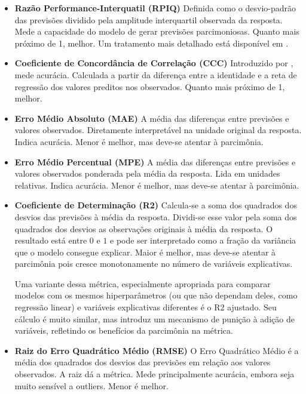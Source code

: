 \begin{itemize}
    \item \textbf{Razão Performance-Interquatil (RPIQ)} \newline
    Definida como o desvio-padrão das previsões dividido pela amplitude interquartil observada da resposta. Mede a capacidade do modelo de gerar previsões parcimoniosas. Quanto mais próximo de 1, melhor. Um tratamento mais detalhado está disponível em .
    
    \item \textbf{Coeficiente de Concordância de Correlação (CCC)} \newline
    Introduzido por , mede acurácia. Calculada a partir da diferença entre a identidade e a reta de regressão dos valores preditos nos observados. Quanto mais próximo de 1, melhor.
    
    \item \textbf{Erro Médio Absoluto (MAE)} \newline
    A média das diferenças entre previsões e valores observados. Diretamente interpretável na unidade original da resposta. Indica acurácia. Menor é melhor, mas deve-se atentar à parcimônia.
    
    \item \textbf{Erro Médio Percentual (MPE)} \newline
    A média das diferenças entre previsões e valores observados ponderada pela média da resposta. Lida em unidades relativas. Indica acurácia. Menor é melhor, mas deve-se atentar à parcimônia.
    
    \item \textbf{Coeficiente de Determinação (R2)} \newline
    Calcula-se a soma dos quadrados dos desvios das previsões à média da resposta. Dividi-se esse valor pela soma dos quadrados dos desvios as observações originais à média da resposta. O resultado está entre $0$ e $1$ e pode ser interpretado como a fração da variância que o modelo consegue explicar. Maior é melhor, mas deve-se atentar à parcimônia pois cresce monotonamente no número de variáveis explicativas.
    
    Uma variante dessa métrica, especialmente apropriada para comparar modelos com os mesmos hiperparâmetros (ou que não dependam deles, como regressão linear) e variáveis explicativas diferentes é o R2 ajustado. Seu cálculo é muito similar, mas introduz um mecanismo de punição à adição de variáveis, refletindo os benefícios da parcimônia na métrica.
    
    
    \item \textbf{Raiz do Erro Quadrático Médio (RMSE)} \newline
    O Erro Quadrático Médio é a média dos quadrados dos desvios das previsões em relação aos valores observados. A raiz dá a métrica. Mede principalmente acurácia, embora seja muito sensível a outliers. Menor é melhor.
    
\end{itemize}

